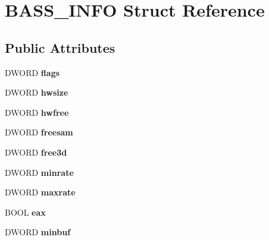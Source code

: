 \hypertarget{structBASS__INFO}{}\section{B\+A\+S\+S\+\_\+\+I\+N\+F\+O Struct Reference}
\label{structBASS__INFO}
\subsection*{Public Attributes}
\begin{DoxyCompactItemize}
\item 
\hypertarget{structBASS__INFO_acc4ee63d143d96b60e96fe55ad66d151}{}D\+W\+O\+R\+D {\bfseries flags}\label{structBASS__INFO_acc4ee63d143d96b60e96fe55ad66d151}

\item 
\hypertarget{structBASS__INFO_a41c357da1c1d00b688c237719acb668b}{}D\+W\+O\+R\+D {\bfseries hwsize}\label{structBASS__INFO_a41c357da1c1d00b688c237719acb668b}

\item 
\hypertarget{structBASS__INFO_a2e7b2bdba56ca19846702cc2251dceaf}{}D\+W\+O\+R\+D {\bfseries hwfree}\label{structBASS__INFO_a2e7b2bdba56ca19846702cc2251dceaf}

\item 
\hypertarget{structBASS__INFO_a1ec0d1abc45e959efd8324a729108eca}{}D\+W\+O\+R\+D {\bfseries freesam}\label{structBASS__INFO_a1ec0d1abc45e959efd8324a729108eca}

\item 
\hypertarget{structBASS__INFO_a04951fd8ee77cdf358ae897e64318f51}{}D\+W\+O\+R\+D {\bfseries free3d}\label{structBASS__INFO_a04951fd8ee77cdf358ae897e64318f51}

\item 
\hypertarget{structBASS__INFO_ae98cb552509ca0cf8a6f034544ad9523}{}D\+W\+O\+R\+D {\bfseries minrate}\label{structBASS__INFO_ae98cb552509ca0cf8a6f034544ad9523}

\item 
\hypertarget{structBASS__INFO_a770602ac32b59b0b563da64276e8110e}{}D\+W\+O\+R\+D {\bfseries maxrate}\label{structBASS__INFO_a770602ac32b59b0b563da64276e8110e}

\item 
\hypertarget{structBASS__INFO_adab4375ade13fe88510db582bd3c919f}{}B\+O\+O\+L {\bfseries eax}\label{structBASS__INFO_adab4375ade13fe88510db582bd3c919f}

\item 
\hypertarget{structBASS__INFO_a855c6df53310491802f018736e81dac4}{}D\+W\+O\+R\+D {\bfseries minbuf}\label{structBASS__INFO_a855c6df53310491802f018736e81dac4}


\end{DoxyCompactItemize}
